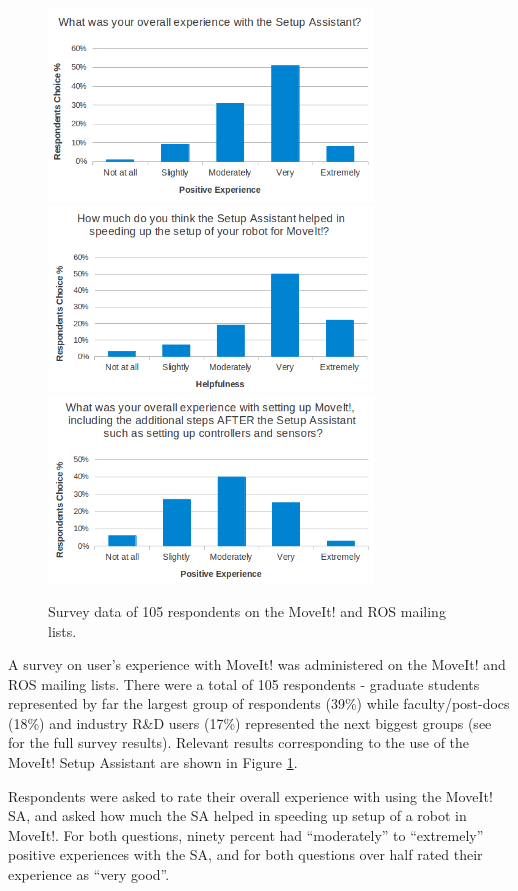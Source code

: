 \documentclass[10pt,journal,compsoc]{joser1}
\begin{document}
{\begin{figure}[!t]
\centering
\includegraphics[width=3.4in]{images/setup_assistant_positive}
\includegraphics[width=3.4in]{images/sa_speedup}
\includegraphics[width=3.4in]{images/moveit_after_sa}
\caption{Survey data of 105 respondents on the MoveIt! and ROS mailing lists.}
\label{fig:setup_assistant_positive}
\end{figure} 

A survey on user's experience with MoveIt! was administered on the MoveIt! and ROS mailing lists. There were a total of 105 respondents - graduate students represented by far the largest group of respondents (39\%) while faculty/post-docs (18\%) and industry R\&D users (17\%) represented the next biggest groups (see \cite{moveit} for the full survey results). Relevant results corresponding to the use of the MoveIt! Setup Assistant are shown in Figure \ref{fig:setup_assistant_positive}. 

Respondents were asked to rate their overall experience with using the MoveIt! SA, and asked how much the SA helped in speeding up setup of a robot in MoveIt!. For both questions, ninety percent had ``moderately'' to ``extremely'' positive experiences with the SA, and for both questions over half rated their experience as ``very good''. 

}
\end{document}
